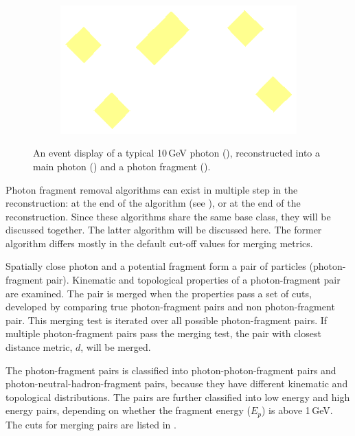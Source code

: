 \begin{figure}[tbph]
\begin{subfigure}[b]{0.3\textwidth}
    \caption{}
    \label{fig:photonEvtDspPhotonFragBig}
  \end{subfigure}
  \begin{subfigure}[b]{0.3\textwidth}
    \includegraphics[width=\textwidth]{photon/small}
    \caption{}
    \label{fig:photonEvtDspPhotonFragSmall}
  \end{subfigure}

\caption
{An event display of a typical 10\,GeV photon (), reconstructed into a main photon () and a photon fragment (). }
\label{fig:photonEvtDspPhotonFrag}
\end{figure}


Photon fragment removal algorithms can exist in multiple step in the reconstruction: at the end of the \PhotonReconstruction algorithm (see ), or at the end of the \pandora reconstruction. Since these algorithms share the same base class, they will be discussed together. The latter algorithm will be discussed here. The former algorithm differs mostly in the default cut-off values for merging metrics.


Spatially close photon and a potential fragment form a pair of particles (photon-fragment pair). Kinematic and topological properties of a photon-fragment pair are examined. The pair is merged when the properties pass a set of cuts, developed by comparing true photon-fragment pairs and non photon-fragment pair. This merging test is iterated over all possible  photon-fragment pairs. If multiple photon-fragment pairs pass the merging test, the pair with closest distance metric, $d$, will be merged.

The photon-fragment pairs is classified into photon-photon-fragment pairs and photon-neutral-hadron-fragment pairs, because they have different kinematic and topological distributions. The pairs are further classified into low energy and high energy pairs, depending on whether the fragment energy ($E_p$) is above 1\,GeV. The cuts for merging pairs are listed in .

